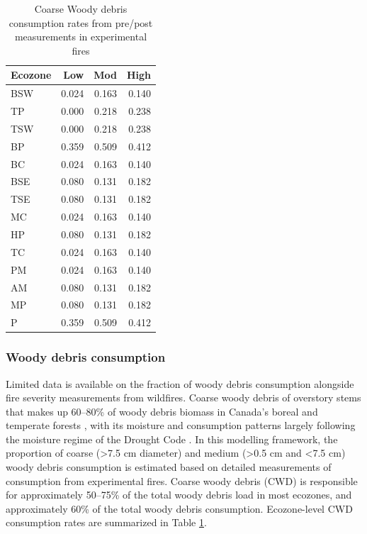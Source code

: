 \documentclass[, manuscript]{copernicus}
\begin{document}
\begin{table}
\centering
\caption{\label{tab:tab-CWDByEcozone}Coarse Woody debris consumption rates from pre/post measurements in experimental fires}
\centering
\begin{tabular}[t]{l|r|r|r}
\hline
Ecozone & Low & Mod & High\\
\hline
BSW & 0.024 & 0.163 & 0.140\\
\hline
TP & 0.000 & 0.218 & 0.238\\
\hline
TSW & 0.000 & 0.218 & 0.238\\
\hline
BP & 0.359 & 0.509 & 0.412\\
\hline
BC & 0.024 & 0.163 & 0.140\\
\hline
BSE & 0.080 & 0.131 & 0.182\\
\hline
TSE & 0.080 & 0.131 & 0.182\\
\hline
MC & 0.024 & 0.163 & 0.140\\
\hline
HP & 0.080 & 0.131 & 0.182\\
\hline
TC & 0.024 & 0.163 & 0.140\\
\hline
PM & 0.024 & 0.163 & 0.140\\
\hline
AM & 0.080 & 0.131 & 0.182\\
\hline
MP & 0.080 & 0.131 & 0.182\\
\hline
P & 0.359 & 0.509 & 0.412\\
\hline
\end{tabular}
\end{table}

\subsubsection{Woody debris consumption}

Limited data is available on the fraction of woody debris consumption
alongside fire severity measurements from wildfires. Coarse woody debris
of overstory stems that makes up 60--80\% of woody debris biomass in
Canada's boreal and temperate forests \citep{hanes2021}, with its
moisture and consumption patterns largely following the moisture regime
of the Drought Code \citep{mcalpine1995}. In this modelling framework,
the proportion of coarse (\textgreater7.5 cm diameter) and medium
(\textgreater0.5 cm and \textless7.5 cm) woody debris consumption is
estimated based on detailed measurements of consumption from
experimental fires. Coarse woody debris (CWD) is responsible for
approximately 50--75\% of the total woody debris load in most ecozones,
and approximately 60\% of the total woody debris consumption.
Ecozone-level CWD consumption rates are summarized in Table
\ref{tab:tab-CWDByEcozone}.
\end{document}
